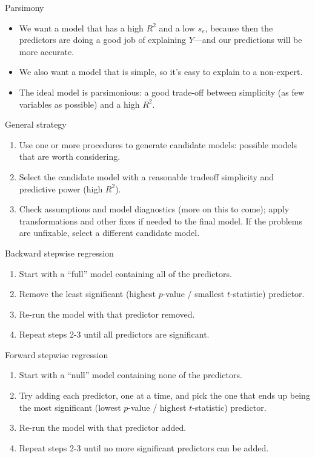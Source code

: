 \documentclass{beamer}\usepackage[]{graphicx}\usepackage[]{color}
\begin{document}
\begin{darkframes}
    \begin{frame}{Parsimony}
      \begin{itemize}[<+->]
        \item We want a model that has a high $R^2$ and a low $s_e$, because then the predictors are doing a good job of explaining $Y$---and our predictions will be more accurate.
        \item We also want a model that is simple, so it's easy to explain to a non-expert.
        \item The ideal model is \alert{parsimonious}: a good trade-off between simplicity (as few variables as possible) and a high $R^2$.
      \end{itemize}
    \end{frame}

    \begin{frame}{General strategy}
      \begin{enumerate}[<+->]
        \item Use one or more procedures to generate candidate models: possible models that are worth considering.
        \item Select the candidate model with a reasonable tradeoff simplicity and predictive power (high $R^2$).
        \item Check assumptions and model diagnostics (more on this to come); apply transformations and other fixes if needed to the final model. If the problems are unfixable, select a different candidate model.
      \end{enumerate}
    \end{frame}

    \begin{frame}{Backward stepwise regression}
      \begin{enumerate}
        \item Start with a ``full'' model containing all of the predictors.
        \item Remove the least significant (highest $p$-value / smallest $t$-statistic) predictor.
        \item Re-run the model with that predictor removed.
        \item Repeat steps 2-3 until all predictors are significant.
      \end{enumerate}
    \end{frame}

    \begin{frame}{Forward stepwise regression}
      \begin{enumerate}
        \item Start with a ``null'' model containing none of the predictors.
        \item Try adding each predictor, one at a time, and pick the one that ends up being the most significant (lowest $p$-value / highest $t$-statistic) predictor.
        \item Re-run the model with that predictor added.
        \item Repeat steps 2-3 until no more significant predictors can be added.
      \end{enumerate}
    \end{frame}


\end{darkframes}
\end{document}
